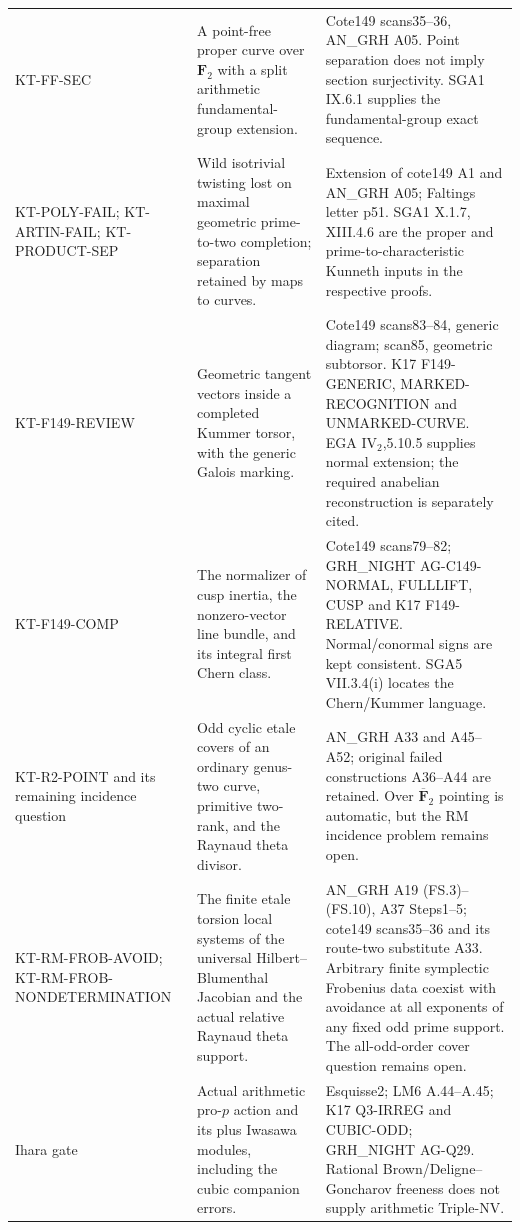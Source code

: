 \documentclass[11pt,a4paper]{article}
\theoremstyle{definition}
\begin{document}
\begin{longtable}{>{\raggedright\arraybackslash}p{}
>{\raggedright\arraybackslash}p{}
>{\raggedright\arraybackslash}p{}}
KT-FF-SEC &
A point-free proper curve over $\mathbf F_2$ with a split
arithmetic fundamental-group extension. &
Cote149 scans35--36, AN\_GRH A05. Point separation does not
imply section surjectivity. SGA1 IX.6.1 supplies the
fundamental-group exact sequence.\\
KT-POLY-FAIL; KT-ARTIN-FAIL; KT-PRODUCT-SEP &
Wild isotrivial twisting lost on maximal geometric
prime-to-two completion; separation retained by maps to curves. &
Extension of cote149 A1 and AN\_GRH A05; Faltings letter p51.
SGA1 X.1.7, XIII.4.6 are the proper and prime-to-characteristic
Kunneth inputs in the respective proofs.\\
KT-F149-REVIEW &
Geometric tangent vectors inside a completed Kummer torsor,
with the generic Galois marking. &
Cote149 scans83--84, generic diagram; scan85, geometric
subtorsor. K17 F149-GENERIC, MARKED-RECOGNITION and
UNMARKED-CURVE. EGA IV$_2$,5.10.5 supplies normal extension;
the required anabelian reconstruction is separately cited.\\
KT-F149-COMP &
The normalizer of cusp inertia, the nonzero-vector line bundle,
and its integral first Chern class. &
Cote149 scans79--82; GRH\_NIGHT AG-C149-NORMAL, FULLLIFT,
CUSP and K17 F149-RELATIVE. Normal/conormal signs are kept
consistent. SGA5 VII.3.4(i) locates the Chern/Kummer language.\\
KT-R2-POINT and its remaining incidence question &
Odd cyclic etale covers of an ordinary genus-two curve,
primitive two-rank, and the Raynaud theta divisor. &
AN\_GRH A33 and A45--A52; original failed constructions
A36--A44 are retained. Over $\overline{\mathbf F}_2$ pointing
is automatic, but the RM incidence problem remains open.\\
KT-RM-FROB-AVOID; KT-RM-FROB-NONDETERMINATION &
The finite etale torsion local systems of the universal
Hilbert--Blumenthal Jacobian and the actual relative
Raynaud theta support. &
AN\_GRH A19 (FS.3)--(FS.10), A37 Steps1--5;
cote149 scans35--36 and its route-two substitute A33.
Arbitrary finite symplectic Frobenius data coexist with
avoidance at all exponents of any fixed odd prime support.
The all-odd-order cover question remains open.\\
Ihara gate &
Actual arithmetic pro-$p$ action and its plus Iwasawa modules,
including the cubic companion errors. &
Esquisse2; LM6 A.44--A.45; K17 Q3-IRREG and CUBIC-ODD;
GRH\_NIGHT AG-Q29. Rational Brown/Deligne--Goncharov
freeness does not supply arithmetic Triple-NV.\\
\bottomrule
\end{longtable}
\normalsize
\end{document}
